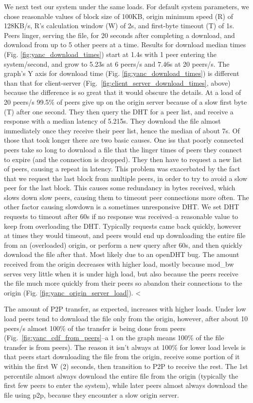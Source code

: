 We next test our system under the same loads. For default system parameters, we chose reasonable values 
of block size of 100KB, origin minimum speed (R) of 128KB/s, R's calculation window (W) 
of 2s, and first-byte timeout (T) of 1s. Peers linger, serving the file, for 20 seconds after completing 
a download, and download from up to 5 other peers at a time. Results for download median times 
(Fig. \ref{fig:yanc_download_times}) start at 1.4s with 1 peer entering the system/second, and grow 
to 5.23s at 6 peers/s and 7.46s at 20 peers/s. The graph's Y axis for download time (Fig. \ref{fig:yanc_download_times}) 
is different than that for client-server (Fig.~\ref{fig:client_server_download_times}, above) 
because the difference is so great that it would obscure the details. At a load of 20 peers/s 99.5\% 
of peers give up on the origin server because of a slow first byte (T) after one second. They then query the 
DHT for a peer list, and receive a response with a median latency of 5.215s.  They download the file almost 
immediately once they receive their peer list, hence the median of about 7s. Of those that took longer 
there are two basic causes. One iss that poorly connected peers take so long to download a file 
that the linger times of peers they connect to expire (and the connection is dropped).   They then have to request a new 
list of peers, causing a repeat in latency.  This problem was exacerbated by the fact that we request 
the last block from multiple peers, in order to try to avoid a slow peer for the last block.  This causes 
some redundancy in bytes received, which slows down slow peers, causing them to timeout peer 
connections more often. The other factor causing slowdown is a sometimes unresponsive DHT. We 
set DHT requests to timeout after 60s if no response was received--a reasonable value to keep from 
overloading the DHT. Typically requests came back quickly, however at times they would timeout, 
and peers would end up downloading the entire file from an (overloaded) origin, or perform a new 
query after 60s, and then quickly download the file after that.  Most likely due to an openDHT bug.
The amount received from the origin decreases with higher load, mostly because mod\_bw serves 
very little when it is under high load, but also because the peers receive the file much more quickly 
from their peers so abandon their connections to the origin (Fig. \ref{fig:yanc_origin_server_load}). 
<%

The amount of P2P transfer, as expected, increases with higher loads. Under low load peers tend to download 
the file only from the origin, however, after about 10 peers/s almost 100\% of the transfer is being 
done from peers (Fig.~\ref{fig:yanc_cdf_from_peers}--a 1 on the graph means 100\% of the file 
transfer is from peers). The reason it isn't always at 100\% for lower load levels is that peers start 
downloading the file from the origin, receive some portion of it within the first W (2) seconds, 
then transition to P2P to receive the rest. The 1st percentile almost always download the entire file from the origin 
(typically the first few peers to enter the system), while later peers almost always download the 
file using p2p, because they encounter a slow origin server. 
